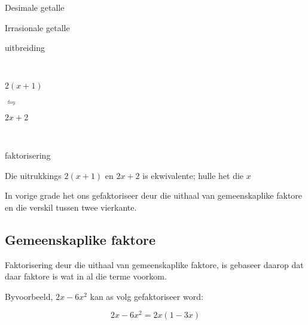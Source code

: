 \begin{Aktiwiteit}{Desimale getalle}
\begin{aktiwiteit}{Irrasionale getalle}
\Identity{}
{
\begin{center}
\begin{small}\hspace{8pt}uitbreiding\end{small}\\
\begin{Large}
$2(x+1)$ \begin{Huge} $\leftrightharpoons$ \end{Huge} $2x+2$
\end{Large}\\
\begin{small}\hspace{8pt}faktorisering\end{small}
\end{center}
}

Die uitrukkings $2(x+1)$ en $2x+2$ is ekwivalente; hulle het die $x$


\par
In vorige grade het ons gefaktoriseer deur die uithaal van gemeenskaplike faktore en die verskil tussen twee vierkante.\par 

\subsection*{Gemeenskaplike faktore}
\nopagebreak
Faktorisering deur die uithaal van gemeenskaplike faktore, is gebaseer daarop dat daar faktore is wat in al die terme voorkom. \par

Byvoorbeeld, $2x-6{x}^{2}$ kan as volg gefaktoriseer word:\par 

\begin{equation*}
2x-6{x}^{2}=2x(1-3x)
\end{equation*}




\end{aktiwiteit}
\end{Aktiwiteit}
